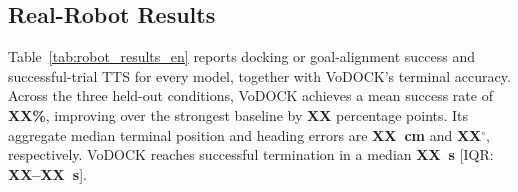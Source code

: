 \documentclass[letterpaper, 10 pt, conference]{IEEEtran}  %
\begin{document}

\subsection{Real-Robot Results}
\label{subsec:robot_results}

Table~\ref{tab:robot_results_en} reports docking or goal-alignment success and successful-trial TTS for every model, together with VoDOCK's terminal accuracy. Across the three held-out conditions, VoDOCK achieves a mean success rate of \textbf{XX\%}, improving over the strongest baseline by \textbf{XX} percentage points. Its aggregate median terminal position and heading errors are \textbf{XX~cm} and \textbf{XX}$^\circ$, respectively. VoDOCK reaches successful termination in a median \textbf{XX~s} [IQR: \textbf{XX--XX~s}].
\end{document}
